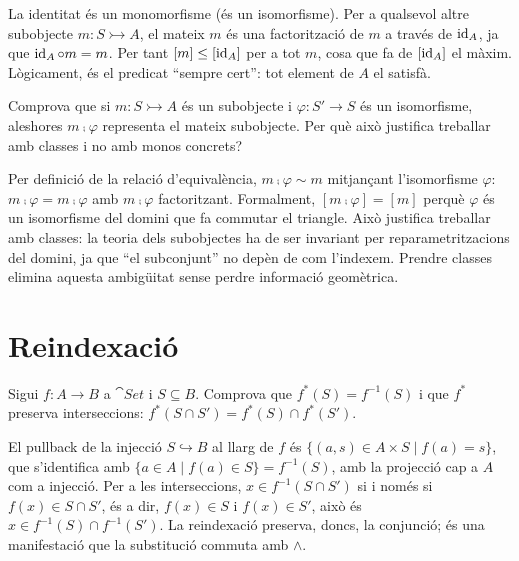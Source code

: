 \begin{solucio}
La identitat és un monomorfisme (és un isomorfisme). Per a qualsevol altre subobjecte $m\colon S\rightarrowtail A$, el mateix $m$ és una factorització de $m$ a través de $\operatorname{id}_A$, ja que $\operatorname{id}_A\circ m=m$. Per tant $[m]\leq[\operatorname{id}_A]$ per a tot $m$, cosa que fa de $[\operatorname{id}_A]$ el màxim. Lògicament, és el predicat \enquote{sempre cert}: tot element de $A$ el satisfà.
\end{solucio}

\begin{exercici}
Comprova que si $m\colon S\rightarrowtail A$ és un subobjecte i $\varphi\colon S'\to S$ és un isomorfisme, aleshores $m\comp\varphi$ representa el mateix subobjecte. Per què això justifica treballar amb classes i no amb monos concrets?
\end{exercici}

\begin{solucio}
Per definició de la relació d'equivalència, $m\comp\varphi\sim m$ mitjançant l'isomorfisme $\varphi$: $m\comp\varphi=m\comp\varphi$ amb $m\comp\varphi$ factoritzant. Formalment, $[m\comp\varphi]=[m]$ perquè $\varphi$ és un isomorfisme del domini que fa commutar el triangle. Això justifica treballar amb classes: la teoria dels subobjectes ha de ser invariant per reparametritzacions del domini, ja que \enquote{el subconjunt} no depèn de com l'indexem. Prendre classes elimina aquesta ambigüitat sense perdre informació geomètrica.
\end{solucio}

\section{Reindexació}

\begin{exercici}
Sigui $f\colon A\to B$ a $\cat{Set}$ i $S\subseteq B$. Comprova que $f^{*}(S)=f^{-1}(S)$ i que $f^{*}$ preserva interseccions: $f^{*}(S\cap S')=f^{*}(S)\cap f^{*}(S')$.
\end{exercici}

\begin{solucio}
El pullback de la injecció $S\hookrightarrow B$ al llarg de $f$ és $\{(a,s)\in A\times S\mid f(a)=s\}$, que s'identifica amb $\{a\in A\mid f(a)\in S\}=f^{-1}(S)$, amb la projecció cap a $A$ com a injecció. Per a les interseccions, $x\in f^{-1}(S\cap S')$ si i només si $f(x)\in S\cap S'$, és a dir, $f(x)\in S$ i $f(x)\in S'$, això és $x\in f^{-1}(S)\cap f^{-1}(S')$. La reindexació preserva, doncs, la conjunció; és una manifestació que la substitució commuta amb $\wedge$.
\end{solucio}


